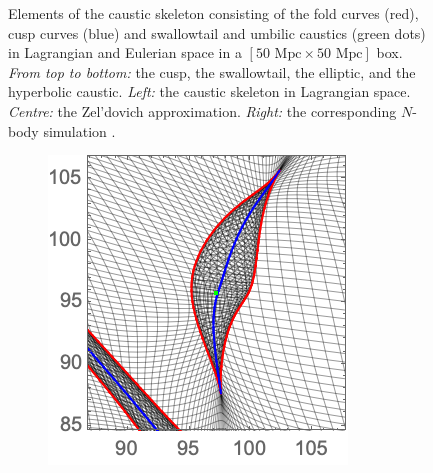\documentclass[a4paper, 11pt]{article}
\begin{document}
\begin{figure}
\begin{subfigure}[b]{0.28\textwidth}
\end{subfigure}
\caption{Elements of the caustic skeleton consisting of the fold curves (red), cusp curves (blue) and swallowtail and umbilic caustics (green dots)
  in Lagrangian and Eulerian space in a $[50\text{ Mpc}\times 50 \text{ Mpc}]$ box. \textit{From top to bottom:} the cusp, the swallowtail, the elliptic, and the hyperbolic caustic. \textit{Left:} the caustic skeleton in Lagrangian space. \textit{Centre:} the Zel'dovich approximation. \textit{Right:} the corresponding $N$-body simulation \cite{Hidding:2020}.}\label{fig:caustics_Examples_Big}
\end{figure}

\begin{figure}
\centering
\begin{subfigure}[b]{0.24\textwidth}
\includegraphics[width=\textwidth]{Cusp_Z_Zoom}
\end{subfigure}~
\begin{subfigure}[b]{0.24\textwidth}

\end{subfigure}
\end{figure}
\end{document}
